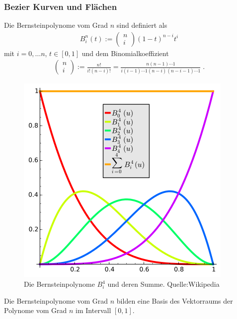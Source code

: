 \subsubsection{Bezier Kurven und Flächen}
\begin{Definition}
Die Bernsteinpolynome vom Grad $n$ sind definiert als
\begin{align*}
B_i^n(t) := \begin{pmatrix} n \\ i \end{pmatrix} (1-t)^{n-i}t^i
\end{align*}
mit $i = 0, \hdots n$, $t \in [0,1]$ und dem Binomialkoeffizient
\begin{align*}
\begin{pmatrix} n \\ i \end{pmatrix} := \frac{n!}{i!(n-i)!} = \frac{n(n-1) \cdots 1}{i(i-1) \cdots 1 (n-i) (n-i-1) \cdots 1 } \; .
\end{align*}
\end{Definition}

\begin{figure}[H]
    \centering
    \includegraphics[scale=0.8]{images/Bernstein_Polynomials.png}
    \caption{Die Bernsteinpolynome $B^{4}_i$ und deren Summe. Quelle:Wikipedia}
    \label{fig:bernstein-polynomial}
\end{figure}

\begin{Bemerkung}
Die Bernsteinpolynome vom Grad $n$ bilden eine Basis des Vektorraums der Polynome vom Grad $n$ im Intervall $[0,1]$.
\end{Bemerkung}

